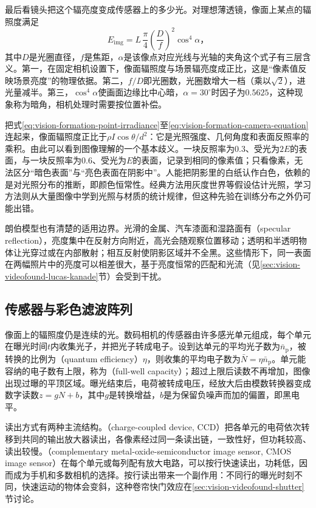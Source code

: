 最后看镜头把这个辐亮度变成传感器上的多少光。对理想薄透镜，像面上某点的辐照度满足
\begin{equation}
  E_{\mathrm{img}}=L\,\frac{\pi}{4}\left(\frac{D}{f}\right)^2\cos^4\alpha\text{，}
  \label{eq:vision-formation-camera-equation}
\end{equation}
其中$D$是光圈直径，$f$是焦距，$\alpha$是该像点对应光线与光轴的夹角这个式子有三层含义。第一，在固定相机设置下，像面辐照度与场景辐亮度成正比，这是“像素值反映场景亮度”的物理依据。第二，$f/D$即光圈数，光圈数增大一档（乘以$\sqrt2$），进光量减半。第三，$\cos^4\alpha$使画面边缘比中心暗，$\alpha=30^\circ$时因子为$0.5625$，这种现象称为暗角，相机处理时需要按位置补偿。

把式\eqref{eq:vision-formation-point-irradiance}至\eqref{eq:vision-formation-camera-equation}连起来，像面辐照度正比于$\rho I\cos\theta/d^2$：它是光照强度、几何角度和表面反照率的乘积。由此可以看到图像理解的一个基本歧义。一块反照率为$0.3$、受光为$2E$的表面，与一块反照率为$0.6$、受光为$E$的表面，记录到相同的像素值；只看像素，无法区分“暗色表面”与“亮色表面在阴影中”。人能把阴影里的白纸认作白色，依赖的是对光照分布的推断，即颜色恒常性。经典方法用灰度世界等假设估计光照，学习方法则从大量图像中学到光照与材质的统计规律，但这种先验在训练分布之外仍可能出错。

朗伯模型也有清楚的适用边界。光滑的金属、汽车漆面和湿路面有（specular reflection），亮度集中在反射方向附近，高光会随观察位置移动；透明和半透明物体让光穿过或在内部散射；相互反射使阴影区域并不全黑。这些情形下，同一表面在两幅照片中的亮度可以相差很大，基于亮度恒常的匹配和光流（见\ref{sec:vision-videofound-lucas-kanade}节）会受到干扰。

\subsection{传感器与彩色滤波阵列}
\label{sec:vision-formation-sensor}

像面上的辐照度仍是连续的光。数码相机的传感器由许多感光单元组成，每个单元在曝光时间$t$内收集光子，并把光子转成电子。设到达单元的平均光子数为$\bar n_{\mathrm p}$，被转换的比例为（quantum efficiency）$\eta$，则收集的平均电子数为$\bar N=\eta\bar n_{\mathrm p}$。单元能容纳的电子数有上限，称为（full-well capacity）；超过上限后读数不再增加，图像出现过曝的平顶区域。曝光结束后，电荷被转成电压，经放大后由模数转换器变成数字读数$z=gN+b$，其中$g$是转换增益，$b$是为保留负噪声而加的偏置，即黑电平。

读出方式有两种主流结构。（charge-coupled device, CCD）把各单元的电荷依次转移到共同的输出放大器读出，各像素经过同一条读出链，一致性好，但功耗较高、读出较慢。（complementary metal-oxide-semiconductor image sensor, CMOS image sensor）在每个单元或每列配有放大电路，可以按行快速读出，功耗低，因而成为手机和多数相机的选择。按行读出带来一个副作用：不同行的曝光时刻不同，快速运动的物体会变斜，这种卷帘快门效应在\ref{sec:vision-videofound-shutter}节讨论。

